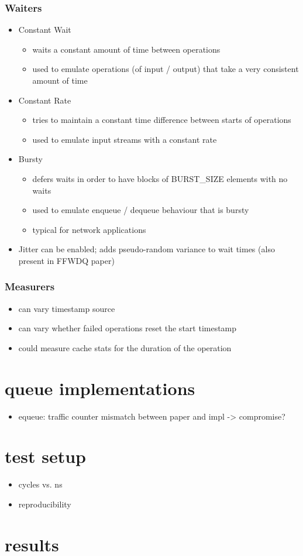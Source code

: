 \documentclass{article}
\begin{document}
\subsubsection{Waiters}
\begin{itemize}
    \item Constant Wait
        \begin{itemize}
            \item waits a constant amount of time between operations
            \item used to emulate operations (of input / output) that take a very consistent amount of time
        \end{itemize}
    \item Constant Rate
        \begin{itemize}
            \item tries to maintain a constant time difference between starts of operations
            \item used to emulate input streams with a constant rate
        \end{itemize}
    \item Bursty
        \begin{itemize}
            \item defers waits in order to have blocks of BURST\_SIZE elements with no waits
            \item used to emulate enqueue / dequeue behaviour that is bursty
            \item typical for network applications
        \end{itemize}
    \item Jitter can be enabled; adds pseudo-random variance to wait times (also present in FFWDQ paper)
\end{itemize}

\subsubsection{Measurers}
\begin{itemize}
    \item can vary timestamp source 
    \item can vary whether failed operations reset the start timestamp 
    \item could measure cache stats for the duration of the operation
\end{itemize}

\section{queue implementations}
\begin{itemize}
    \item equeue: traffic counter mismatch between paper and impl -> compromise?
\end{itemize}

\section{test setup}
\begin{itemize}
    \item cycles vs. ns
    \item reproducibility
\end{itemize}

\section{results}
\end{document}
